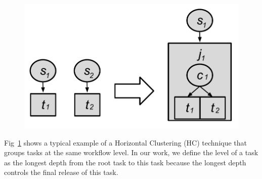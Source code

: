 \documentclass[final]{IEEEtran}
\begin{document}
\begin{figure}[htb]
\centering
 \includegraphics[width=0.65\linewidth]{figure/hc.pdf}
  \label{fig:hc}
  \vspace{-15pt}
\end{figure}


Fig~\ref{fig:hc} shows a typical example of a Horizontal Clustering (HC) technique that groups tasks at the same workflow level. In our work, we define the level of a task as the longest depth from the root task to this task because the longest depth controls the final release of this task. 
\end{document}
